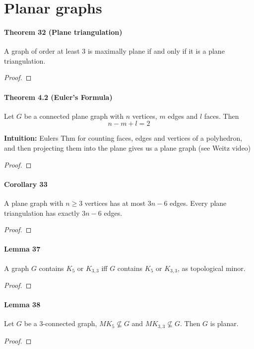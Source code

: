 \section{Planar graphs}

\paragraph{Theorem 32 (Plane triangulation)} A graph of order at least 3 is 
maximally plane if and only if it is a plane triangulation.
\begin{proof}
    
\end{proof}

\paragraph{Theorem 4.2 (Euler's Formula)} Let $ G $ be a connected plane graph 
with $ n $ vertices, $ m $ edges and $ l $ faces. Then 
$$ n - m + l = 2 $$

\smallskip \noindent
\textbf{Intuition:} Eulers Thm for counting faces, edges and vertices of a 
polyhedron, and then projecting them into the plane gives us a plane graph 
(see Weitz video)
\begin{proof}
    
\end{proof}

\paragraph{Corollary 33} A plane graph with $ n \geq 3 $ vertices has at most 
$ 3n - 6 $ edges. Every plane triangulation has exactly $ 3n - 6 $ edges.
\begin{proof}

\end{proof}

\paragraph{Lemma 37} A graph $ G $ contains $ K_5 $ or $ K_{3,3} $ iff 
$ G $ contains $ K_5 $ or $ K_{3,3} $, as topological minor.
\begin{proof}
    
\end{proof}

\paragraph{Lemma 38} Let $ G $ be a 3-connected graph, $ MK_5 \nsubseteq G $ and 
$ MK_{3,3} \nsubseteq G $. Then $ G $ is planar.
\begin{proof}
    
\end{proof}

